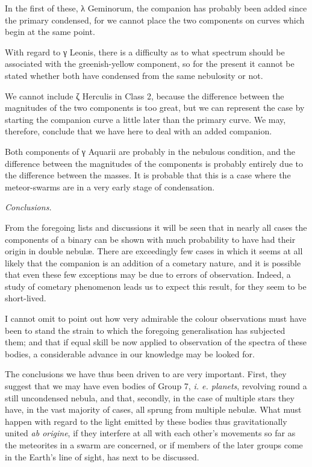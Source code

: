 \documentclass[a4paper, 12pt, oneside, polutonikogreek, english]{article}
\begin{document}
In the first of these, λ Geminorum, the companion has probably been added since the primary condensed, for we cannot place the two components on curves which begin at the same point.

With regard to γ Leonis, there is a difficulty as to what spectrum should be associated with the greenish-yellow component, so for the present it cannot be stated whether both have condensed from the same nebulosity or not.

We cannot include ζ Herculis in Class 2, because the difference between the magnitudes of the two components is too great, but we can represent the case by starting the companion curve a little later than the primary curve. We may, therefore, conclude that we have here to deal with an added companion.

Both components of γ Aquarii are probably in the nebulous condition, and the difference between the magnitudes of the components is probably entirely due to the difference between the masses. It is probable that this is a case where the meteor-swarms are in a very early stage of condensation.

\emph{Conclusions.}

From the foregoing lists and discussions it will be seen that in nearly all cases the components of a binary can be shown with much probability to have had their origin in double nebulæ. There are exceedingly few cases in which it seems at all likely that the companion is an addition of a cometary nature, and it is possible that even these few exceptions may be due to errors of observation. Indeed, a study of cometary phenomenon leads us to expect this result, for they seem to be short-lived.

I cannot omit to point out how very admirable the colour observations must have been to stand the strain to which the foregoing generalisation has subjected them; and that if equal skill be now applied to observation of the spectra of these bodies, a considerable advance in our knowledge may be looked for.

The conclusions we have thus been driven to are very important. First, they suggest that we may have even bodies of Group 7, \emph{i. e. planets}, revolving round a still uncondensed nebula, and that, secondly, in the case of multiple stars they have, in the vast majority of cases, all sprung from multiple nebulæ. What must happen with regard to the light emitted by these bodies thus gravitationally united \emph{ab origine}, if they interfere at all with each other's movements so far as the meteorites in a swarm are concerned, or if members of the later groups come in the Earth's line of sight, has next to be discussed.
\end{document}
